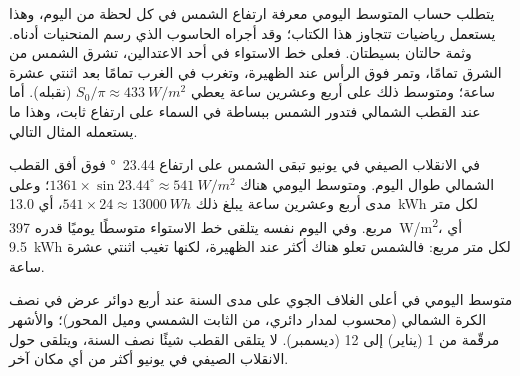 يتطلب حساب المتوسط اليومي معرفة ارتفاع الشمس في كل لحظة من اليوم، وهذا يستعمل
رياضيات تتجاوز هذا الكتاب؛ وقد أجراه الحاسوب الذي رسم المنحنيات أدناه. وثمة
حالتان بسيطتان. فعلى خط الاستواء في أحد الاعتدالين، تشرق الشمس من الشرق تمامًا،
وتمر فوق الرأس عند الظهيرة، وتغرب في الغرب تمامًا بعد اثنتي عشرة ساعة؛ ومتوسط
ذلك على أربع وعشرين ساعة يعطي $S_0/\pi \approx \qty{433}{W/m^2}$ (نقبله). أما
عند القطب الشمالي فتدور الشمس ببساطة في السماء على ارتفاع ثابت، وهذا ما يستعمله
المثال التالي.

\begin{example}\label{ex:g10:earth-energy-budget:pole}
في الانقلاب الصيفي في يونيو تبقى الشمس على ارتفاع \qty{23.44}{\degree} فوق أفق
القطب الشمالي طوال اليوم. ومتوسط  اليومي هناك $1361
\times \sin 23.44^\circ \approx \qty{541}{W/m^2}$؛ وعلى مدى أربع وعشرين ساعة
يبلغ ذلك $541 \times 24 \approx \qty{13000}{Wh}$، أي \qty{13.0}{kWh} لكل متر
مربع. وفي اليوم نفسه يتلقى خط الاستواء متوسطًا يوميًا قدره
\qty{397}{W/m^2}، أي \qty{9.5}{kWh} لكل متر مربع: فالشمس تعلو هناك أكثر عند
الظهيرة، لكنها تغيب اثنتي عشرة ساعة.
\end{example}

\begin{omfigure}

{\small متوسط  اليومي في أعلى الغلاف الجوي على مدى السنة عند أربع دوائر عرض
في نصف الكرة الشمالي (محسوب لمدار دائري، من الثابت الشمسي وميل المحور)؛ والأشهر
مرقّمة من 1 (يناير) إلى 12 (ديسمبر). لا يتلقى القطب شيئًا نصف السنة، ويتلقى حول
الانقلاب الصيفي في يونيو أكثر من أي مكان آخر.}
\end{omfigure}

